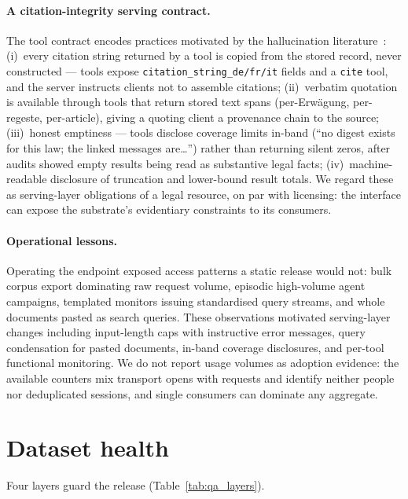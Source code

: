 \documentclass[11pt,a4paper]{article}
\begin{document}
\paragraph{A citation-integrity serving contract.} The tool contract encodes practices motivated by the hallucination literature~\cite{dahl2024,magesh2024,charlotin2026}: (i)~every citation string returned by a tool is copied from the stored record, never constructed --- tools expose \texttt{citation\_string\_de/fr/it} fields and a \texttt{cite} tool, and the server instructs clients not to assemble citations; (ii)~verbatim quotation is available through tools that return stored text spans (per-Erwägung, per-regeste, per-article), giving a quoting client a provenance chain to the source; (iii)~honest emptiness --- tools disclose coverage limits in-band (``no digest exists for this law; the linked messages are\dots'') rather than returning silent zeros, after audits showed empty results being read as substantive legal facts; (iv)~machine-readable disclosure of truncation and lower-bound result totals. We regard these as serving-layer obligations of a legal resource, on par with licensing: the interface can expose the substrate's evidentiary constraints to its consumers.

\paragraph{Operational lessons.} Operating the endpoint exposed access patterns a static release would not: bulk corpus export dominating raw request volume, episodic high-volume agent campaigns, templated monitors issuing standardised query streams, and whole documents pasted as search queries. These observations motivated serving-layer changes including input-length caps with instructive error messages, query condensation for pasted documents, in-band coverage disclosures, and per-tool functional monitoring. We do not report usage volumes as adoption evidence: the available counters mix transport opens with requests and identify neither people nor deduplicated sessions, and single consumers can dominate any aggregate.

\section{Dataset health}\label{sec:infra}

Four layers guard the release (Table~\ref{tab:qa_layers}).
\end{document}
